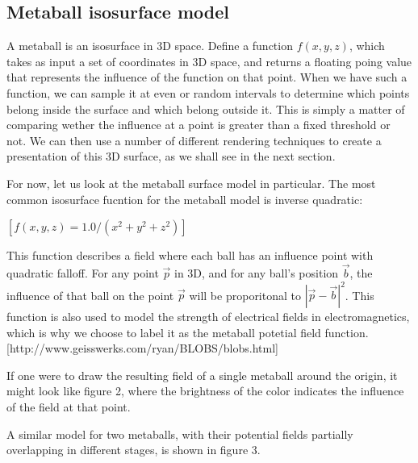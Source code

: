 \documentclass{article}
\begin{document}
\begin{multicols}{2}
        \subsection{Metaball isosurface model}
            A metaball is an isosurface in 3D space. 
            Define a function $f(x,y,z)$, which takes as input a set of coordinates in 3D space, and returns a floating poing value that represents the influence of the function on that point.
            When we have such a function, we can sample it at even or random intervals to determine which points belong inside the surface and which belong outside it.
            This is simply a matter of comparing wether the influence at a point is greater than a fixed threshold or not.
            We can then use a number of different rendering techniques to create a presentation of this 3D surface, as we shall see in the next section.

            For now, let us look at the metaball surface model in particular. The most common isosurface fucntion for the metaball model is inverse quadratic:

            $[f(x,y,z) = 1.0 / (x^2 + y^2 + z^2)]$

            This function describes a field where each ball has an influence point with quadratic falloff.
            For any point $\vec{p}$ in 3D, and for any ball's position $\vec{b}$, the influence of that ball on the point $\vec{p}$ will be proporitonal to $|\vec{p} - \vec{b}|^2$.
            This function is also used to model the strength of electrical fields in electromagnetics, which is why we choose to label it as the metaball potetial field function.
            [http://www.geisswerks.com/ryan/BLOBS/blobs.html]

            If one were to draw the resulting field of a single metaball around the origin, it might look like figure 2, where the brightness of the color indicates the influence of the field at that point.
            
            A similar model for two metaballs, with their potential fields partially overlapping in different stages, is shown in figure 3.
            

\end{multicols}
\end{document}
